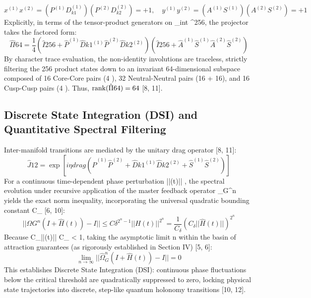 \documentclass[12pt, a4paper]{article}
\begin{document}
\begin{equation}
x^{(1)}x^{(2)} = (P^{(1)}D_{k1}^{(1)})(P^{(2)}D_{k2}^{(2)}) = +1, \quad y^{(1)}y^{(2)} = (A^{(1)}S^{(1)})(A^{(2)}S^{(2)}) = +1
\end{equation}
Explicitly, in terms of the tensor-product generators on _{int} \cong {}^{256}, the projector takes the factored form:
\begin{equation}
\hat{\Pi}{64} = \frac{1}{4} \left(\hat{I}{256} + \hat{P}^{(1)}\hat{D}{k1}^{(1)}\hat{P}^{(2)}\hat{D}{k2}^{(2)}\right)\left(\hat{I}{256} + \hat{A}^{(1)}\hat{S}^{(1)}\hat{A}^{(2)}\hat{S}^{(2)}\right)
\end{equation}
By character trace evaluation, the non-identity involutions are traceless, strictly filtering the 256 product states down to an invariant 64-dimensional subspace composed of 16 Core-Core pairs (4 ), 32 Neutral-Neutral pairs (16 + 16), and 16 Cusp-Cusp pairs (4 ). Thus, $\rank(\hat{\Pi}{64}) = 64$ [8, 11].
​\subsection{Discrete State Integration (DSI) and Quantitative Spectral Filtering}
Inter-manifold transitions are mediated by the unitary drag operator [8, 11]:
\begin{equation}
\hat{J}{12} = \exp\left[i\eta{drag}\left(\hat{P}^{(1)}\hat{P}^{(2)} + \hat{D}{k1}^{(1)}\hat{D}{k2}^{(2)} + \hat{S}^{(1)}\hat{S}^{(2)}\right)\right]
\end{equation}
For a continuous time-dependent phase perturbation ||(t)|| \le \delta {}, the spectral evolution under recursive application of the master feedback operator \hat{\Omega}_{G}^{n} yields the exact norm inequality, incorporating the universal quadratic bounding constant C_{\delta}  [6, 10]:
\begin{equation}
||\hat{\Omega}{G}^{n}(I + \hat{H}(t)) - I|| \le C{\delta}^{2^{n}-1}||\hat{H}(t)||^{2^{n}} = \frac{1}{C_{\delta}}(C_{\delta}||\hat{H}(t)||)^{2^{n}}
\end{equation}
Because C_{\delta}||(t)|| \le C_{\delta}\delta {} < 1, taking the asymptotic limit n \rightarrow \infty within the basin of attraction guarantees (as rigorously established in Section IV) [5, 6]:
\begin{equation}
\lim_{n \rightarrow \infty} ||\hat{\Omega}_{G}^{n}(I + \hat{H}(t)) - I|| = 0
\end{equation}
This establishes Discrete State Integration (DSI): continuous phase fluctuations below the critical threshold are quadratically suppressed to zero, locking physical state trajectories into discrete, step-like quantum holonomy transitions [10, 12].
\end{document}
